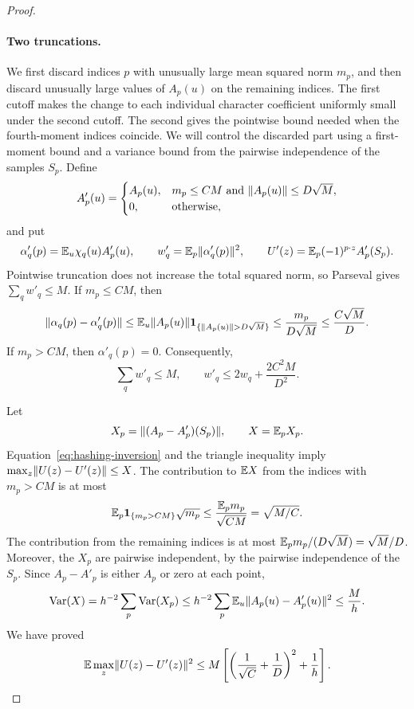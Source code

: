 \begin{proof}
\paragraph{Two truncations.}
We first discard indices $p$ with unusually large mean squared norm
$m_p$, and then discard unusually large values of $A_p(u)$ on the
remaining indices. The first cutoff makes the change to each individual
character coefficient uniformly small under the second cutoff. The
second gives the pointwise bound needed when the fourth-moment indices
coincide. We will control the discarded part using a first-moment bound
and a variance bound from the pairwise independence of the samples $S_p$.
Define
\[
 A'_p(u)=
 \begin{cases}
 A_p(u),&m_p\le CM\text{ and }\lVert A_p(u)\rVert\le D\sqrt M,\\
 0,&\text{otherwise},
 \end{cases}
\]
and put
\[
 \alpha'_q(p)=\mathbb E_u\chi_q(u)A'_p(u),
 \qquad w'_q=\mathbb E_p\lVert\alpha'_q(p)\rVert^2,
 \qquad U'(z)=\mathbb E_p(-1)^{p\cdot z}A'_p(S_p).
\]
Pointwise truncation does not increase the total squared norm, so Parseval
gives $\sum_qw'_q\le M$.  If $m_p\le CM$, then
\[
 \lVert\alpha_q(p)-\alpha'_q(p)\rVert
 \le\mathbb E_u\lVert A_p(u)\rVert
       \mathbf 1_{\{\lVert A_p(u)\rVert>D\sqrt M\}}
 \le\frac{m_p}{D\sqrt M}
 \le\frac{C\sqrt M}{D}.
\]
If $m_p>CM$, then $\alpha'_q(p)=0$.  Consequently,
\begin{equation}\label{eq:hashing-truncated-mass}
 \sum_qw'_q\le M,
 \qquad
 w'_q\le 2w_q+\frac{2C^2M}{D^2}.
\end{equation}

Let
\[
 X_p=\lVert(A_p-A'_p)(S_p)\rVert,\qquad X=\mathbb E_pX_p.
\]
Equation~\eqref{eq:hashing-inversion} and the triangle inequality imply
$\max_z\lVert U(z)-U'(z)\rVert\le X$.  The contribution to $\mathbb E X$ from the
indices with $m_p>CM$ is at most
\[
 \mathbb E_p\mathbf 1_{\{m_p>CM\}}\sqrt{m_p}
 \le\frac{\mathbb E_p m_p}{\sqrt{CM}}=\sqrt{M/C}.
\]
The contribution from the remaining indices is at most
$\mathbb E_p m_p/(D\sqrt M)=\sqrt M/D$.  Moreover, the $X_p$ are pairwise
independent, by the pairwise independence of the $S_p$.  Since
$A_p-A'_p$ is either $A_p$ or zero at each point,
\[
 \operatorname{Var}(X)
 =h^{-2}\sum_p\operatorname{Var}(X_p)
 \le h^{-2}\sum_p\mathbb E_u\lVert A_p(u)-A'_p(u)\rVert^2
 \le\frac Mh.
\]
We have proved
\begin{equation}\label{eq:hashing-truncation-error}
 \mathbb E\max_z\lVert U(z)-U'(z)\rVert^2
 \le M\left[\left(\frac1{\sqrt C}+\frac1D\right)^2+\frac1h\right].
\end{equation}


\end{proof}
